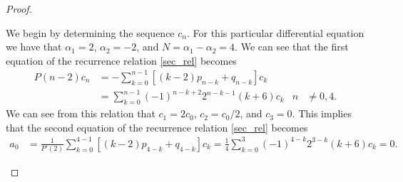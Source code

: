 \documentclass[12pt]{article}
\theoremstyle{definition}
\begin{document}
\begin{proof}
\begin{enumerate}
      We begin by determining the sequence $c_n$. For this particular differential equation
      we have that $\alpha_1 = 2$, $\alpha_2 = -2$, and $N = \alpha_1 - \alpha_2 = 4$.
      We can see that the first equation of the recurrence relation \eqref{sec_rel} becomes
      \begin{align*}
        P(n - 2)c_n &=-\sum_{k=0}^{n-1} [(k - 2)p_{n-k} + q_{n-k}]c_k && \\
        &= \sum_{k=0}^{n-1} (-1)^{n-k+2}2^{n-k-1}(k+6)c_k &n&\neq0,4.
      \end{align*}
      We can see from this relation that $c_1 = 2c_0$, $c_2 = c_0 /2$, and $c_3=0$.
      This implies that the second equation of the recurrence relation \eqref{sec_rel} becomes
      \begin{align*}
        a_0 &= \frac{1}{P'(2)}\sum_{k=0}^{4-1}[(k - 2)p_{4-k} + q_{4-k}]c_k = \frac{1}{4} \sum_{k=0}^3(-1)^{4-k}2^{3-k}(k+6)c_k = 0.
      \end{align*}


\end{enumerate}
\end{proof}
\end{document}
